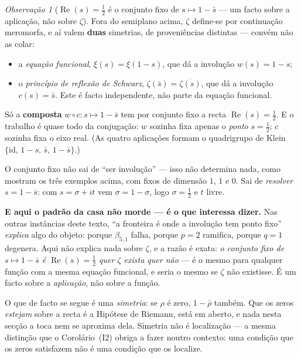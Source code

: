 \documentclass[11pt,a4paper]{article}
\theoremstyle{plain}
\theoremstyle{definition}
\theoremstyle{remark}
\newtheorem{obs}[teorema]{Observação}
\begin{document}
\begin{obs}[$\operatorname{Re}(s)=\tfrac12$ é o conjunto fixo de $s\mapsto1-\bar s$ --- um facto sobre a aplicação, não sobre $\zeta$]\label{obs:critica}
Fora do semiplano acima, $\zeta$ define-se por continuação meromorfa, e aí valem \textbf{duas}
simetrias, de proveniências distintas --- convém não as colar:
\begin{itemize}\itemsep2pt
\item a \emph{equação funcional}, $\xi(s) = \xi(1-s)$, que dá a involução $w(s) = 1-s$;
\item o \emph{princípio de reflexão de Schwarz}, $\zeta(\bar s) = \overline{\zeta(s)}$, que dá a
involução $c(s) = \bar s$. Este é facto independente, não parte da equação funcional.
\end{itemize}
Só a \textbf{composta} $w\circ c\colon s\mapsto 1-\bar s$ tem por conjunto fixo a recta
$\operatorname{Re}(s)=\tfrac12$. E o trabalho é quase todo da conjugação: $w$ sozinha fixa apenas
o \emph{ponto} $s=\tfrac12$; $c$ sozinha fixa o eixo real. (As quatro aplicações formam o
quadrigrupo de Klein $\{\mathrm{id},\,1-s,\,\bar s,\,1-\bar s\}$.)

O conjunto fixo não sai de ``ser involução'' --- isso não determina nada, como mostram os três
exemplos acima, com fixos de dimensão $1$, $1$ e $0$. Sai de \emph{resolver} $s = 1-\bar s$: com
$s = \sigma+it$ vem $\sigma = 1-\sigma$, logo $\sigma=\tfrac12$ e $t$ livre.

\textbf{E aqui o padrão da casa não morde --- é o que interessa dizer.} Nas outras instâncias deste
texto, ``a fronteira é onde a involução tem ponto fixo'' \emph{explica} algo do objeto: porque
$\beta_{5,1}$ falha, porque $p=2$ ramifica, porque $q=1$ degenera. Aqui não explica nada sobre
$\zeta$, e a razão é exata: \emph{o conjunto fixo de $s\mapsto1-\bar s$ é
$\operatorname{Re}(s)=\tfrac12$ quer $\zeta$ exista quer não} --- é o mesmo para qualquer função
com a mesma equação funcional, e seria o mesmo se $\zeta$ não existisse. É um facto sobre a
\emph{aplicação}, não sobre a função.

O que de facto se segue é uma \emph{simetria}: se $\rho$ é zero, $1-\bar\rho$ também. Que os zeros
\emph{estejam} sobre a recta é a Hipótese de Riemann, está em aberto, e nada nesta secção a toca
nem se aproxima dela. Simetria não é localização --- a mesma distinção que o
Corolário~(I2) obriga a fazer noutro contexto: uma condição que os zeros satisfazem
não é uma condição que os localize.
\end{obs}
\end{document}
